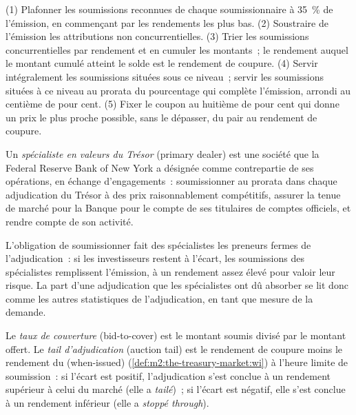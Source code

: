 \begin{method}\label{met:m2:the-treasury-market:run}
(1) Plafonner les soumissions reconnues de chaque soumissionnaire à 35~\% de l'émission, en commençant par les
rendements les plus bas. (2) Soustraire de l'émission les attributions non concurrentielles. (3) Trier
les soumissions concurrentielles par rendement et en cumuler les montants~; le rendement auquel le montant cumulé
atteint le solde est le rendement de coupure. (4) Servir intégralement les soumissions situées sous ce niveau~;
servir les soumissions situées à ce niveau au prorata du pourcentage qui complète l'émission, arrondi au
centième de pour cent. (5) Fixer le coupon au huitième de pour cent qui
donne un prix le plus proche possible, sans le dépasser, du pair au rendement de coupure.
\end{method}

\begin{definition}\label{def:m2:the-treasury-market:pd}
Un \emph{spécialiste en valeurs du Trésor} (primary dealer) est une société que la
Federal Reserve Bank of New York a désignée comme contrepartie de ses opérations,
en échange d'engagements~: soumissionner au prorata dans chaque adjudication du Trésor
à des prix raisonnablement compétitifs, assurer la tenue de marché pour la Banque
pour le compte de ses titulaires de comptes officiels, et rendre compte de son activité.
\end{definition}

L'obligation de soumissionner fait des spécialistes les preneurs fermes de l'adjudication~: si
les investisseurs restent à l'écart, les soumissions des spécialistes remplissent l'émission, à un rendement
assez élevé pour valoir leur risque. La part d'une adjudication que les spécialistes ont dû absorber se lit donc
comme les autres statistiques de l'adjudication, en tant que mesure de la demande.

\begin{definition}\label{def:m2:the-treasury-market:tail}
Le \emph{taux de couverture} (bid-to-cover) est le montant soumis
divisé par le montant offert. Le \emph{tail d'adjudication} (auction tail)
est le rendement de coupure moins le rendement du  (when-issued)
(\cref{def:m2:the-treasury-market:wi}) à l'heure limite de soumission~: si l'écart est positif,
l'adjudication s'est conclue à un rendement supérieur à celui du marché (elle a \emph{tailé})~;
si l'écart est négatif, elle s'est conclue à un rendement inférieur (elle a \emph{stoppé through}).
\end{definition}

